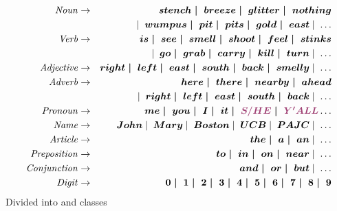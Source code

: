 \documentclass{article}
\begin{document}
\begin{huge}
\begin{eqnarray*}
\bnf{Noun} & \bnfeq & \bnft{stench \bnfor breeze \bnfor glitter \bnfor nothing} \\
        & &\bnfor \bnft{wumpus \bnfor pit \bnfor pits\bnfor gold \bnfor east} \bnfor \ldots \\
\bnf{Verb} & \bnfeq & \bnft{is \bnfor see \bnfor smell \bnfor shoot \bnfor feel \bnfor stinks}\\
        & &\bnfor \bnft{go \bnfor grab \bnfor carry \bnfor kill \bnfor turn} \bnfor \ldots \\
\bnf{Adjective} & \bnfeq & \bnft{right \bnfor left \bnfor east \bnfor south \bnfor back \bnfor smelly} \bnfor \ldots \\
\bnf{Adverb} & \bnfeq & \bnft{here \bnfor there \bnfor nearby \bnfor ahead} \\
        &&\bnfor \bnft{right \bnfor left \bnfor east \bnfor south \bnfor back} \bnfor \ldots \\
\bnf{Pronoun} & \bnfeq & \bnft{me \bnfor you \bnfor I \bnfor it \bnfor \mat{S/HE} \bnfor \mat{Y'ALL}} \ldots \\
\bnf{Name} & \bnfeq & \bnft{John} \bnfor \bnft{Mary} \bnfor \bnft{Boston}
	\bnfor \bnft{UCB} \bnfor \bnft{PAJC} \bnfor \ldots \\
\bnf{Article} & \bnfeq & \bnft{the \bnfor a \bnfor an} \bnfor \ldots \\
\bnf{Preposition} & \bnfeq & \bnft{to \bnfor in \bnfor on \bnfor near} \bnfor \ldots \\
\bnf{Conjunction} & \bnfeq & \bnft{and \bnfor or \bnfor but} \bnfor \ldots \\
\bnf{Digit} & \bnfeq & \bnft{0\bnfor 1\bnfor 2\bnfor 3\bnfor 4\bnfor 5\bnfor 6\bnfor 7\bnfor 8\bnfor 9}
\end{eqnarray*}
Divided into  and  classes


\vspace*{-0.2in}


\end{huge}
\end{document}
